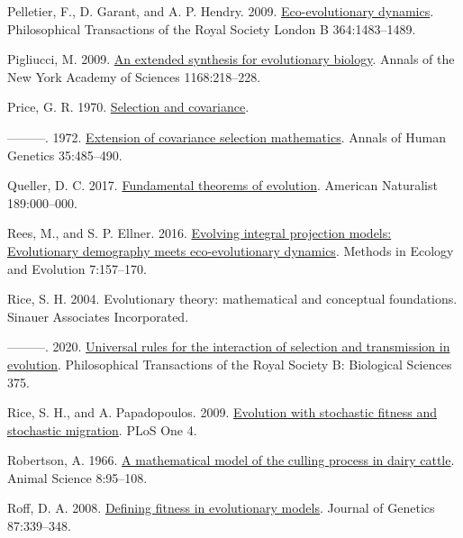 \documentclass[
]{article}
\newlength{\cslhangindent}
\newenvironment{CSLReferences}[2] %
 {\begin{list}{}{%
  \setlength{\itemindent}{0pt}
  \setlength{\leftmargin}{0pt}
  \setlength{\parsep}{0pt}
  \ifodd #1
   \setlength{\leftmargin}{\cslhangindent}
   \setlength{\itemindent}{-1\cslhangindent}
  \fi
  \setlength{\itemsep}{#2\baselineskip}}}
 {\end{list}}
\begin{document}
\begin{CSLReferences}{1}{0}
Pelletier, F., D. Garant, and A. P. Hendry. 2009.
\href{https://doi.org/10.1098/rstb.2009.0027}{Eco-evolutionary
dynamics}. Philosophical Transactions of the Royal Society London B
364:1483--1489.

Pigliucci, M. 2009.
\href{https://doi.org/10.1111/j.1749-6632.2009.04578.x}{{An extended
synthesis for evolutionary biology}}. Annals of the New York Academy of
Sciences 1168:218--228.

Price, G. R. 1970. \href{https://doi.org/10.1038/227520a0}{{Selection
and covariance}}.

---------. 1972.
\href{https://doi.org/10.1111/j.1469-1809.1957.tb01874.x}{{Extension of
covariance selection mathematics}}. Annals of Human Genetics
35:485--490.

Queller, D. C. 2017. \href{https://doi.org/10.1086/690937}{{Fundamental
theorems of evolution}}. American Naturalist 189:000--000.

Rees, M., and S. P. Ellner. 2016.
\href{https://doi.org/10.1111/2041-210X.12487}{Evolving integral
projection models: Evolutionary demography meets eco-evolutionary
dynamics}. Methods in Ecology and Evolution 7:157--170.

Rice, S. H. 2004. {Evolutionary theory: mathematical and conceptual
foundations}. Sinauer Associates Incorporated.

---------. 2020.
\href{https://doi.org/10.1098/rstb.2019.0353}{{Universal rules for the
interaction of selection and transmission in evolution}}. Philosophical
Transactions of the Royal Society B: Biological Sciences 375.

Rice, S. H., and A. Papadopoulos. 2009.
\href{https://doi.org/10.1371/journal.pone.0007130}{{Evolution with
stochastic fitness and stochastic migration}}. PLoS One 4.

Robertson, A. 1966. \href{https://doi.org/10.1017/S0003356100037752}{{A
mathematical model of the culling process in dairy cattle}}. Animal
Science 8:95--108.

Roff, D. A. 2008.
\href{https://doi.org/10.1007/s12041-008-0056-9}{{Defining fitness in
evolutionary models}}. Journal of Genetics 87:339--348.


\end{CSLReferences}
\end{document}
